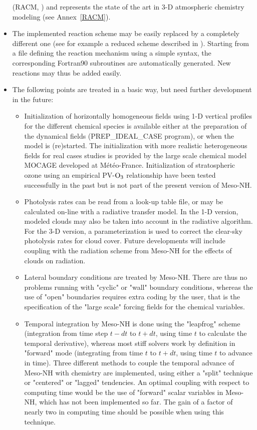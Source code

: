 \begin{itemize}
      (RACM, \citet{Stockwell1997})
      and represents the state of the art in 3-D atmospheric chemistry
      modeling  (see Annex~\ref{RACM}).
\item The implemented reaction scheme may be easily replaced by a
      completely different one (see for example a reduced scheme described
      in \citet{Crassier2000}).
      Starting from a file defining the reaction mechanism
      using a simple syntax, the corresponding Fortran90 subroutines
      are automatically generated. New reactions may thus be added easily.
\item The following points are treated in a basic way,
      but need further development in the future:
  \begin{itemize}
    \item Initialization of horizontally homogeneous fields using 1-D vertical 
        profiles for the different chemical species is available
        either at the preparation of the dynamical fields
        (PREP\_IDEAL\_CASE program), or when the model is (re)started.
        The initialization with more realistic heterogeneous fields 
        for real cases studies is provided by 
        the large scale chemical model MOCAGE developed at M\'et\'eo-France.
        Initialization of stratospheric ozone using an empirical
        PV-$\rm O_3$ relationship have been tested successfully in
        the past but is not part of the present version of Meso-NH.
    \item Photolysis rates can be read from a look-up table file,
        or may be calculated on-line with a radiative transfer model.
        In the 1-D version, modeled clouds may also be taken into
        account in the radiative algorithm. For the 3-D version, a 
        parameterization is used to correct the clear-sky photolysis rates for
        cloud cover. Future developments will include 
        coupling with the radiation scheme from Meso-NH for the effects of
        clouds on radiation.
    \item Lateral boundary conditions are treated by Meso-NH.
        There are thus no problems
        running with "cyclic" or "wall" boundary conditions, whereas
        the use of "open" boundaries requires extra coding by the user,
        that is the specification of the "large scale" forcing fields
        for the chemical variables.
    \item Temporal integration by Meso-NH is done using the "leapfrog" scheme
        (integration from time step $t-dt$ to $t+dt$, using time $t$
        to calculate the temporal derivative),
        whereas most stiff solvers work by definition in "forward" mode
        (integrating from time $t$ to $t+dt$,
        using time $t$ to advance in time).
        Three different methods to couple the temporal advance of
        Meso-NH with chemistry are implemented, using either a "split"
        technique or "centered" or "lagged" tendencies.
        An optimal coupling with respect to computing time would be
        the use of "forward" scalar variables in Meso-NH, which has not been
        implemented so far. The gain of a factor of nearly
        two in computing time should be possible when using this technique.
  \end{itemize}
\end{itemize}
